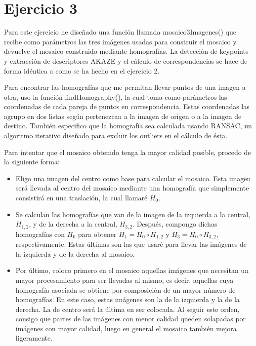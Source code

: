 \documentclass[10pt,a4paper]{article}
\begin{document}
\newpage
\section{Ejercicio 3}

Para este ejercicio he diseñado una función llamada mosaico3Imagenes() que recibe como parámetros las tres imágenes usadas para construir el mosaico y devuelve el mosaico construido mediante homografías. La detección de keypoints y extracción de descriptores AKAZE y el cálculo de correspondencias se hace de forma idéntica a como se ha hecho en el ejercicio 2.

Para encontrar las homografías que me permitan llevar puntos de una imagen a otra, uso la función findHomography(), la cual toma como parámetros las coordenadas de cada pareja de puntos en correspondencia. Estas coordenadas las agrupo en dos listas según pertenezcan a la imagen de origen o a la imagen de destino. También especifico que la homografía sea calculada usando RANSAC, un algoritmo iterativo diseñado para excluir los outliers en el cálculo de ésta. 

Para intentar que el mosaico obtenido tenga la mayor calidad posible, procedo de la siguiente forma:
\begin{itemize}
	\item Eligo una imagen del centro como base para calcular el mosaico. Esta imagen será llevada al centro del mosaico mediante una homografía que simplemente consistirá en una traslación, la cual llamaré $H_0$.
	\item Se calculan las homografías que van de la imagen de la izquierda a la central, $H_{1,2}$, y de la derecha a la central, $H_{3,2}$. Después, compongo dichas homografías con $H_0$ para obtener $H_1 = H_0 \circ H_{1,2}$ y $H_3 = H_0 \circ H_{3,2}$, respectivamente. Estas últimas son las que usaré para llevar las imágenes de la izquierda y de la derecha al mosaico.
	\item Por último, coloco primero en el mosaico aquellas imágenes que necesitan un mayor procesamiento para ser llevadas al mismo, es decir, aquellas cuya homografía asociada se obtiene por composición de un mayor número de homografías. En este caso, estas imágenes son la de la izquierda y la de la derecha. La de centro será la última en ser colocada. Al seguir este orden, consigo que partes de las imágenes con menor calidad queden solapadas por imágenes con mayor calidad, luego en general el mosaico también mejora ligeramente.
\end{itemize}
\end{document}

